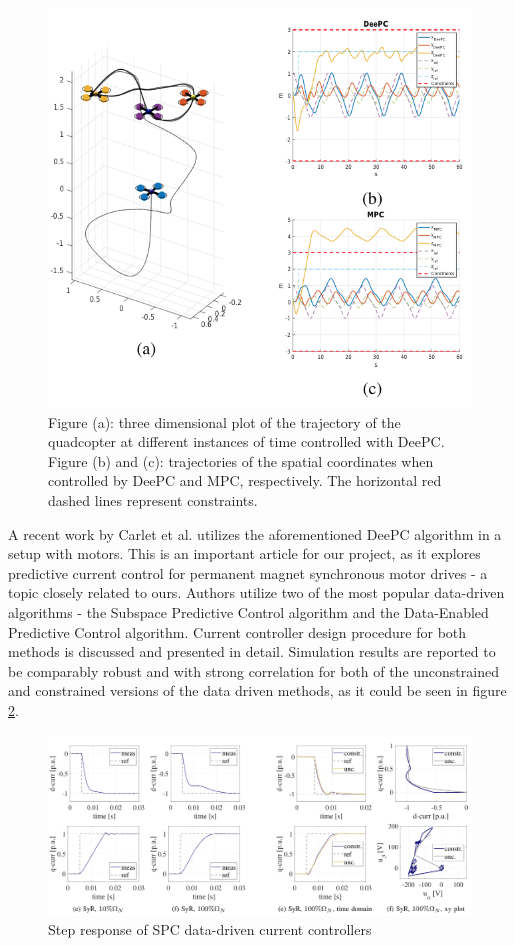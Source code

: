 \documentclass[]{final_report}
\begin{document}
\begin{figure} [h!]
\centerline{\includegraphics[width=.75\textwidth]{Screenshots for related work/5.png}}
\caption{Figure (a): three dimensional plot of the trajectory of the quadcopter at different instances of time controlled with DeePC.  Figure  (b)  and  (c):  trajectories  of  the  spatial  coordinates  when  controlled  by  DeePC  and  MPC,  respectively. The horizontal red dashed lines represent constraints.
\cite{coulson2019data}}
\label{fig:quadsim}
\end{figure}

A recent work by Carlet et al. \cite{carlet2020data} utilizes the aforementioned DeePC algorithm in a setup with motors. This is an important article for our project, as it explores predictive current control for permanent  magnet synchronous motor drives - a topic closely related to ours. Authors utilize two  of  the  most  popular data-driven   algorithms - the   Subspace Predictive  Control  algorithm  and  the  Data-Enabled  Predictive Control  algorithm. Current  controller  design  procedure for both methods is discussed and presented in detail. Simulation results are reported to be comparably robust and with strong correlation for both of the unconstrained  and  constrained  versions  of  the  data  driven  methods, as it could be seen in figure \ref{fig:controllercomp}.

\begin{figure} [h!]
\centerline{\includegraphics[width=.95\textwidth]{Screenshots for related work/4.png}}
\caption{Step response of SPC data-driven current controllers
\cite{carlet2020data}}
\label{fig:controllercomp}
\end{figure}
\end{document}
